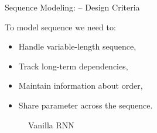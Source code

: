 \documentclass[11pt,compress,t,notes=noshow]{beamer}
\begin{document}
\begin{frame} {Sequence Modeling: -- Design Criteria}

To model sequence we need to:


  \begin{itemize}
    \item Handle variable-length sequence,
    \item Track long-term dependencies,
    \item Maintain information about order,
    \item Share parameter across the sequence.
  \end{itemize}

  \begin{figure}
      \centering
      \caption{\footnotesize {Vanilla RNN}}
  \end{figure}

\end{frame}
\end{document}
